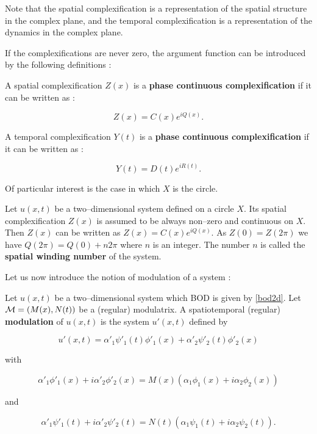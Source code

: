 Note that the spatial complexification is a representation of the 
spatial structure in the complex plane, and the temporal 
complexification is a representation of the dynamics in 
the complex plane.

\medskip

If the complexifications are never zero, the argument function 
can be introduced by the following definitions :

\begin{defn}
A spatial complexification $Z(x)$ is a {\bf phase continuous 
complexification} if it can be written as :

\begin{equation}
Z(x)=C(x)e^{iQ(x)}.
\end{equation}

\end{defn}

\begin{defn}
A temporal complexification $Y(t)$ is a {\bf phase continuous 
complexification} if it can be written as :

\begin{equation}
Y(t)=D(t)e^{iR(t)}.
\end{equation}

\end{defn}

Of particular interest is the case in which $X$ is the circle.

\begin{defn}
Let $u(x,t)$ be a two--dimensional system defined on a circle $X$.
Its spatial complexification $Z(x)$ is assumed to be always non--zero
and continuous on $X$. Then $Z(x)$ can be written as 
$Z(x)=C(x)e^{iQ(x)}$. 
As $Z(0)=Z(2\pi)$ we have $Q(2\pi)=Q(0)+n2\pi$ where $n$ is an integer.
The number $n$ is called the {\bf spatial winding number} of the system.
\end{defn}


Let us now introduce the notion of modulation of a system :

\begin{defn}
Let $u(x,t)$ be a two--dimensional system which BOD is given by 
\ref{bod2d}. Let ${\cal M}=(M(x),N(t))$ be a (regular) modulatrix.
A spatiotemporal (regular) {\bf modulation} of $u(x,t)$ is the system 
$u'(x,t)$ defined by

\begin{equation}
u'(x,t)=\alpha'_1\psi'_1(t)\phi'_1(x)+\alpha'_2\psi'_2(t)\phi'_2(x)
\end{equation}

with 

\begin{equation}
\alpha'_1\phi'_1(x)+i\alpha'_2\phi'_2(x)=M(x)(\alpha_1\phi_1(x)+
i\alpha_2\phi_2(x))
\end{equation}

and 

\begin{equation}
\alpha'_1\psi'_1(t)+i\alpha'_2\psi'_2(t)=N(t)
(\alpha_1\psi_1(t)+i\alpha_2\psi_2(t)).
\end{equation}

\end{defn}

